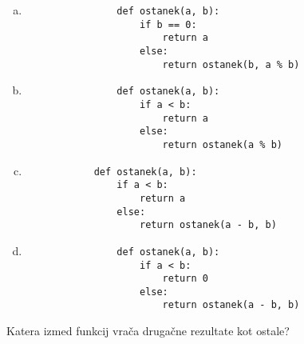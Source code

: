 \documentclass[arhiv, 10pt]{../izpit}
\begin{document}
        \begin{multicols}{2}
        \begin{enumerate}[(a)]
\item 
                \begin{verbatim}
                def ostanek(a, b):
                    if b == 0:
                        return a
                    else:
                        return ostanek(b, a % b)
                \end{verbatim}
            
\item 
                \begin{verbatim}
                def ostanek(a, b):
                    if a < b:
                        return a
                    else:
                        return ostanek(a % b)
                \end{verbatim}
            
\item 
            \begin{verbatim}
            def ostanek(a, b):
                if a < b:
                    return a
                else:
                    return ostanek(a - b, b)
            \end{verbatim}
        
\item 
                \begin{verbatim}
                def ostanek(a, b):
                    if a < b:
                        return 0
                    else:
                        return ostanek(a - b, b)
                \end{verbatim}
            
\end{enumerate}

        \end{multicols}
    
        \naloga*
        
        Katera izmed funkcij vrača drugačne rezultate kot ostale?
    
\end{document}
